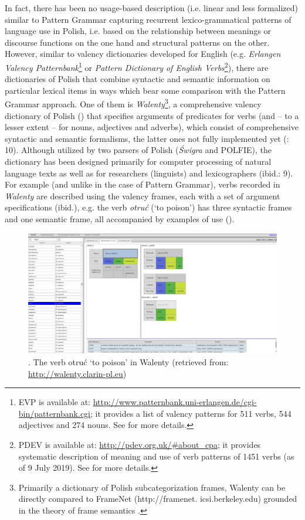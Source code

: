 \documentclass[output=paper]{langscibook}
\begin{document}
In fact, there has been no usage-based description (i.e. linear and less formalized) similar to Pattern Grammar capturing recurrent lexico-grammatical patterns of language use in Polish, i.e. based on the relationship between meanings or discourse functions on the one hand and structural patterns on the other. However, similar to valency dictionaries developed for English (e.g. \textit{Erlangen Valency Patternbank}\footnote{\textrm{EVP is available at:} \url{http://www.patternbank.uni-erlangen.de/cgi-bin/patternbank.cgi}\textrm{; it provides a list of valency patterns for 511 verbs, 544 adjectives and 274 nouns. See \citet{HerbstEtAl2004} for more details.}} or \textit{Pattern Dictionary of English Verbs}\footnote{\textrm{PDEV is available at:} \url{http://pdev.org.uk/\#about_cpa}\textrm{; it provides systematic description of meaning and use of verb patterns of 1451 verbs (as of 9 July 2019). See \citet{Hanks2013} for more details.}}), there are dictionaries of Polish that combine syntactic and semantic information on particular lexical items in ways which bear some comparison with the Pattern Grammar approach. One of them is \textit{Walenty}\footnote{Primarily a dictionary of Polish subcategorization frames, Walenty can be directly compared to FrameNet (http://framenet. icsi.berkeley.edu) grounded in the theory of frame semantics \citep{Fillmore1982}.}, a comprehensive valency dictionary of Polish (\citealt{PrzepiórkowskiEtAl2017Phraseology,PrzepiórkowskiEtAl2017Walenty}) that specifies arguments of predicates for verbs (and -- to a lesser extent -- for nouns, adjectives and adverbs), which consist of comprehensive syntactic and semantic formalisms, the latter ones not fully implemented yet (\citealt{PrzepiórkowskiEtAl2017Phraseology}: 10). Although utilized by two parsers of Polish (\textit{Świgra} and POLFIE), the dictionary has been designed primarily for computer processing of natural language texts as well as for researchers (linguists) and lexicographers (ibid.: 9). For example (and unlike in the case of Pattern Grammar), verbs recorded in \textit{Walenty} are described using the valency frames, each with a set of argument specifications (ibid.), e.g. the verb \textit{otruć} (‘to poison’) has three syntactic frames and one semantic frame, all accompanied by examples of use ().

   
\begin{figure}
\includegraphics[width=\textwidth]{figures/grabowski-img001.png}
\caption{\label{fig:grabowski:1}. The verb otruć ‘to poison’ in Walenty (retrieved from: \url{http://walenty.clarin-pl.eu})}
\end{figure}
\end{document}

